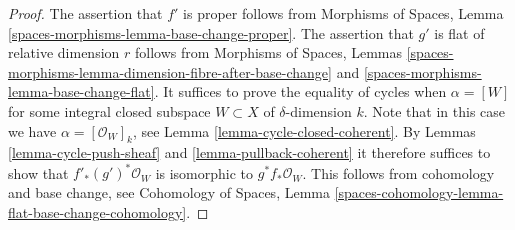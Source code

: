 \documentclass[10pt,a4paper]{amsart}
\theoremstyle{plain}
\theoremstyle{definition}
\theoremstyle{remark}
\numberwithin{equation}{subsection}
\begin{document}
\begin{proof}
The assertion that $f'$ is proper follows from
Morphisms of Spaces, Lemma \ref{spaces-morphisms-lemma-base-change-proper}.
The assertion that $g'$ is flat of relative dimension $r$ follows from
Morphisms of Spaces, Lemmas
\ref{spaces-morphisms-lemma-dimension-fibre-after-base-change}
and \ref{spaces-morphisms-lemma-base-change-flat}.
It suffices to prove the equality of cycles when $\alpha = [W]$
for some integral closed subspace $W \subset X$ of $\delta$-dimension $k$.
Note that in this case we have $\alpha = [\mathcal{O}_W]_k$, see
Lemma \ref{lemma-cycle-closed-coherent}.
By Lemmas \ref{lemma-cycle-push-sheaf} and
\ref{lemma-pullback-coherent} it therefore suffices
to show that $f'_*(g')^*\mathcal{O}_W$ is isomorphic to
$g^*f_*\mathcal{O}_W$. This follows from cohomology and
base change, see Cohomology of Spaces, Lemma
\ref{spaces-cohomology-lemma-flat-base-change-cohomology}.
\end{proof}
\end{document}
